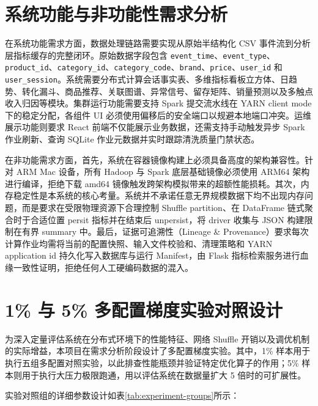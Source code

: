 \section{系统功能与非功能性需求分析}

在系统功能需求方面，数据处理链路需要实现从原始半结构化 CSV 事件流到分析层指标缓存的完整闭环。原始数据字段包含 \texttt{event\_time}、\texttt{event\_type}、\texttt{product\_id}、\texttt{category\_id}、\texttt{category\_code}、\texttt{brand}、\texttt{price}、\texttt{user\_id} 和 \texttt{user\_session}。系统需要分布式计算会话事实表、多维指标看板立方体、日趋势、转化漏斗、商品推荐、关联图谱、异常信号、留存矩阵、销量预测以及多触点收入归因等模块。集群运行功能需要支持 Spark 提交流水线在 YARN client mode 下的稳定分配，各组件 UI 必须使用偏移后的安全端口以规避本地端口冲突。运维展示功能则要求 React 前端不仅能展示业务数据，还需支持手动触发异步 Spark 作业刷新、查询 SQLite 作业元数据并实时跟踪清洗质量门禁状态。

在非功能需求方面，首先，系统在容器镜像构建上必须具备高度的架构兼容性。针对 ARM Mac 设备，所有 Hadoop 与 Spark 底层基础镜像必须使用 ARM64 架构进行编译，拒绝下载 amd64 镜像触发跨架构模拟带来的超额性能损耗。其次，内存稳定性是本系统的核心考量。系统并不承诺任意无界规模数据下均不出现内存问题，而是要求在受限物理资源下合理控制 Shuffle partition、在 DataFrame 链式聚合时于合适位置 persit 指标并在结束后 unpersist，将 driver 收集与 JSON 构建限制在有界 summary 中。最后，证据可追溯性（Lineage \& Provenance）要求每次计算作业均需将当前的配置快照、输入文件校验和、清理策略和 YARN application id 持久化写入数据库与运行 Manifest，由 Flask 指标检索服务进行血缘一致性证明，拒绝任何人工硬编码数据的混入。

\section{1\% 与 5\% 多配置梯度实验对照设计}

为深入定量评估系统在分布式环境下的性能特征、网络 Shuffle 开销以及调优机制的实际增益，本项目在需求分析阶段设计了多配置梯度实验。其中，1\% 样本用于执行五组多配置对照实验，以此排查性能瓶颈并验证特定优化算子的作用；5\% 样本则用于执行大压力极限跑通，用以评估系统在数据量扩大 5 倍时的可扩展性。

实验对照组的详细参数设计如表\ref{tab:experiment-groups}所示：

